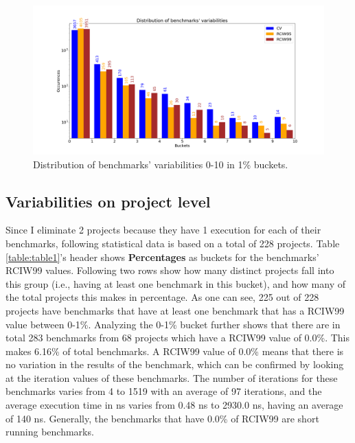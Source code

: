 \documentclass{seal_thesis}
\begin{document}
\begin{figure}[H]
	\centering
	\includegraphics[width=\linewidth]{resultsvis/log2}
	\caption{Distribution of benchmarks' variabilities 0-10 in 1\% buckets.}
	\label{fig:log2}
\end{figure}

\subsection{Variabilities on project level}

Since I eliminate 2 projects because they have 1 execution for each of their benchmarks, following statistical data is based on a total of 228 projects. Table \ref{table:table1}'s header shows \textbf{Percentages} as buckets for the benchmarks' RCIW99 values. Following two rows show how many distinct projects fall into this group (i.e., having at least one benchmark in this bucket), and how many of the total projects this makes in percentage. As one can see, 225 out of 228 projects have benchmarks that have at least one benchmark that has a RCIW99 value between 0-1\%. Analyzing the 0-1\% bucket further shows that there are in total 283 benchmarks from 68 projects which have a RCIW99 value of 0.0\%. This makes 6.16\% of total benchmarks. A RCIW99 value of 0.0\% means that there is no variation in the results of the benchmark, which can be confirmed by looking at the iteration values of these benchmarks. The number of iterations for these benchmarks varies from 4 to 1519 with an average of 97 iterations, and the average execution time in ns varies from 0.48 ns to 2930.0 ns, having an average of 140 ns. Generally, the benchmarks that have 0.0\% of RCIW99 are short running benchmarks.
\end{document}
